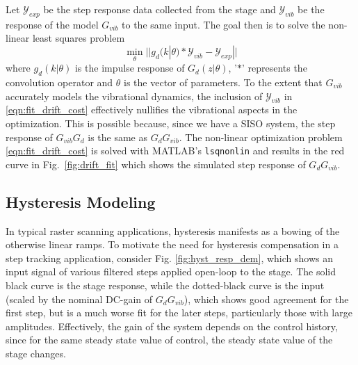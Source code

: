 \documentclass[journal,twocolumn,twoside]{IEEEtran}
\begin{document}
Let $\mathcal{Y}_{exp}$ be the step response data collected from the stage and  $\mathcal{Y}_{vib}$ be the response of the model $G_{vib}$ to the same input. The goal then is to solve the non-linear least squares problem
\begin{equation}
  \min_{\theta}|| g_d(k|\theta)*\mathcal{Y}_{vib} - \mathcal{Y}_{exp}||
  \label{eqn:fit_drift_cost}
\end{equation}
where $g_d(k|\theta)$ is the impulse response of $G_d(z|\theta)$, '$*$' represents the convolution operator and  $\theta$ is the vector of parameters. To the extent that $G_{vib}$ accurately models the vibrational dynamics, the inclusion of $\mathcal{Y}_{vib}$ in \eqref{eqn:fit_drift_cost} effectively nullifies the vibrational aspects in the optimization. This is possible because, since we have a SISO system, the step response of $G_{vib}G_d$ is the same as $G_dG_{vib}$.
The non-linear optimization problem \eqref{eqn:fit_drift_cost} is solved with MATLAB's \texttt{lsqnonlin} and results in the red curve in Fig.~\ref{fig:drift_fit} which shows the simulated step response of $G_dG_{vib}$. 


\subsection{Hysteresis Modeling}\label{sec:hyst_model}
In typical raster scanning applications, hysteresis manifests as a bowing of the otherwise linear ramps. To motivate the need for hysteresis compensation in a step tracking application, consider Fig. \ref{fig:hyst_resp_dem}, which shows an input signal of various filtered steps applied open-loop to the stage. The solid black curve is the stage response, while the dotted-black curve is the input (scaled by the nominal DC-gain of $G_dG_{vib}$), which shows good agreement for the first step, but is a much worse fit for the later steps, particularly those with large amplitudes. Effectively, the gain of the system depends on the control history, since for the same steady state value of control, the steady state value of the stage changes.
\end{document}
